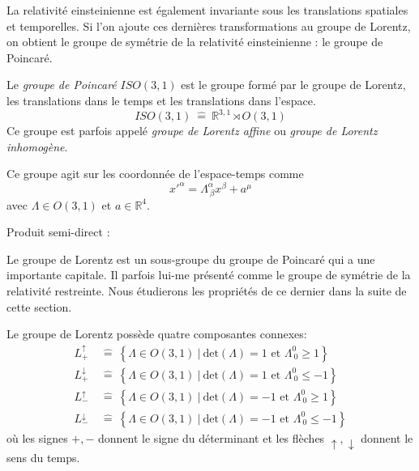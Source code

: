 \documentclass[a4paper,11pt]{report}
\begin{document}
            La relativité einsteinienne est également invariante sous les translations spatiales et temporelles. Si l'on ajoute ces dernières transformations au groupe de Lorentz, on obtient le groupe de symétrie de la relativité einsteinienne : le groupe de Poincaré.
            \begin{defn}
                Le \textit{groupe de Poincaré} $ISO(3,1)$ est le groupe formé par le groupe de Lorentz, les translations dans le temps et les translations dans l'espace.
                \begin{equation}
                    ISO(3,1) ~\hat{=}~ \mathbb{R}^{3,1}\rtimes O(3,1)
                \end{equation}
                Ce groupe est parfois appelé \textit{groupe de Lorentz affine} ou \textit{groupe de Lorentz inhomogène}.
            \end{defn}
            
            Ce groupe agit sur les coordonnée de l'espace-temps comme
            \begin{equation}
                x'^\alpha = \Lambda^\alpha_{~\beta}x^\beta + a^\mu
            \end{equation}
            avec $\Lambda\in O(3,1)$ et $a\in\mathbb{R}^4$.
            
            \begin{rmk}
                Produit semi-direct :
                \comp
            \end{rmk}
            
            Le groupe de Lorentz est un sous-groupe du groupe de Poincaré qui a une importante capitale. Il parfois lui-me présenté comme le groupe de symétrie de la relativité restreinte. Nous étudierons les propriétés de ce dernier dans la suite de cette section.
            
            \begin{prop}\begin{leftbar}
                Le groupe de Lorentz possède quatre composantes connexes:
                \begin{align}
                    L^\uparrow_+ &~\hat{=}~ \left\{\Lambda\in O(3,1)~\big|~\text{det}(\Lambda) = 1\text{ et }\Lambda^0_{~0}\geq1\right\} \\
                    L^\downarrow_+ &~\hat{=}~ \left\{\Lambda\in O(3,1)~\big|~\text{det}(\Lambda) = 1\text{ et }\Lambda^0_{~0}\leq -1\right\} \\
                    L^\uparrow_- &~\hat{=}~ \left\{\Lambda\in O(3,1)~\big|~\text{det}(\Lambda) = -1\text{ et }\Lambda^0_{~0}\geq1\right\} \\
                    L^\downarrow_- &~\hat{=}~ \left\{\Lambda\in O(3,1)~\big|~\text{det}(\Lambda) = -1\text{ et }\Lambda^0_{~0}\leq-1\right\}
                \end{align}
                où les signes $+,-$ donnent le signe du déterminant et les flèches $\uparrow,\downarrow$ donnent le sens du temps.
            \end{leftbar}\end{prop}
            
\end{document}
